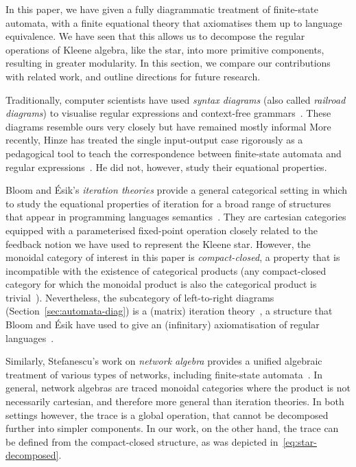\documentclass{lmcs}
\theoremstyle{plain}\newtheorem{satz}[thm]{Satz} %
\begin{document}
In this paper, we have given a fully diagrammatic treatment of finite-state automata, with a finite equational theory that axiomatises them up to language equivalence. We have seen that this allows us to decompose the regular operations of Kleene algebra, like the star, into more primitive components, resulting in greater modularity. In this section, we compare our contributions with related work, and outline directions for future research.

Traditionally, computer scientists have used \emph{syntax diagrams} (also called \emph{railroad diagrams}) to visualise regular expressions and context-free grammars~\cite{wirth1971programming}. These diagrams resemble ours very closely but have remained mostly informal
More recently, Hinze has treated the single input-output case rigorously as a pedagogical tool to teach the correspondence between finite-state automata and regular expressions~\cite{hinze2019self}. He did not, however, study their equational properties.


Bloom and {\'E}sik's \emph{iteration theories} provide a general categorical setting in which to study the equational properties of iteration for a broad range of structures that appear in programming languages semantics~\cite{bloom1993iteration}. They are cartesian categories equipped with a parameterised fixed-point operation closely related to the feedback notion we have used to represent the Kleene star. However, the monoidal category of interest in this paper is \emph{compact-closed}, a property that is incompatible with the existence of categorical products (any compact-closed category for which the monoidal product is also the categorical product is trivial~\cite{lambek1988introduction}). Nevertheless, the subcategory of left-to-right diagrams (Section~\ref{sec:automata-diag}) is a (matrix) iteration theory~\cite{bloom1993matrix}, a structure that Bloom and {\'E}sik have used to give an (infinitary) axiomatisation of regular languages~\cite{bloom1993equational}.

Similarly, Stefanescu's work on \emph{network algebra} provides a unified algebraic treatment of various types of networks, including finite-state automata~\cite{stefanescu2000network}. In general, network algebras are traced monoidal categories where the product is not necessarily cartesian, and therefore more general than iteration theories. In both settings however, the trace is a global operation, that cannot be decomposed further into simpler components. In our work, on the other hand, the trace can be defined from the compact-closed structure, as was depicted in~\eqref{eq:star-decomposed}.
\end{document}
